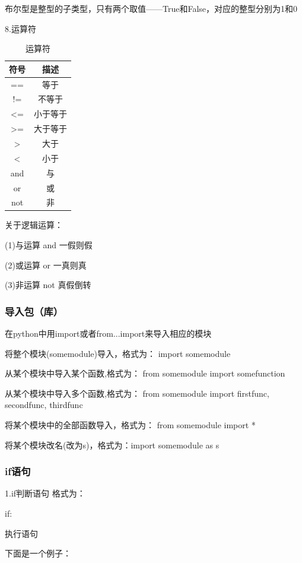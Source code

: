 \documentclass{ctexart}
\begin{document}
	布尔型是整型的子类型，只有两个取值——True和False，对应的整型分别为1和0
	
	8.运算符
	
	\begin{table}[h]
		\centering
		\caption{运算符}
		\begin{tabular}{|c|c|}
			\hline
			符号 & 描述  \\
			\hline
			== & 等于 \\
			\hline
			!= & 不等于\\
			\hline
			<= &小于等于\\ 
			\hline
			>= & 大于等于\\
			\hline
			>&大于\\
			\hline
			<&小于\\
			\hline
			and&与\\
			\hline
			or&或\\
			\hline
			not&非\\
			\hline
		\end{tabular}
	\end{table}
	
	关于逻辑运算：
	
	(1)与运算 and 一假则假
	
	(2)或运算 or 一真则真
	
	(3)非运算 not 真假倒转
	
	\subsubsection{导入包（库）}
	
	在python中用import或者from...import来导入相应的模块
	
	将整个模块(somemodule)导入，格式为： import somemodule
	
	从某个模块中导入某个函数,格式为： from somemodule import somefunction
	
	从某个模块中导入多个函数,格式为： from somemodule import firstfunc, secondfunc, thirdfunc
	
	将某个模块中的全部函数导入，格式为： from somemodule import *
	
	将某个模块改名(改为s)，格式为：import somemodule as s
	\subsubsection{if语句}
	1.if判断语句 格式为：
	
	if:
	
	\quad \quad 执行语句
	
	下面是一个例子：
	
\end{document}
